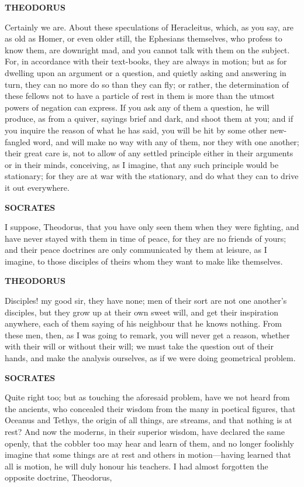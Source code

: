\documentclass[11pt,letter]{article}
\begin{document}
\par \textbf{THEODORUS}
\par   Certainly we are. About these speculations of Heracleitus, which, as you say, are as old as Homer, or even older still, the Ephesians themselves, who profess to know them, are downright mad, and you cannot talk with them on the subject. For, in accordance with their text-books, they are always in motion; but as for dwelling upon an argument or a question, and quietly asking and answering in turn, they can no more do so than they can fly; or rather, the determination of these fellows not to have a particle of rest in them is more than the utmost powers of negation can express. If you ask any of them a question, he will produce, as from a quiver, sayings brief and dark, and shoot them at you; and if you inquire the reason of what he has said, you will be hit by some other new-fangled word, and will make no way with any of them, nor they with one another; their great care is, not to allow of any settled principle either in their arguments or in their minds, conceiving, as I imagine, that any such principle would be stationary; for they are at war with the stationary, and do what they can to drive it out everywhere.

\par \textbf{SOCRATES}
\par   I suppose, Theodorus, that you have only seen them when they were fighting, and have never stayed with them in time of peace, for they are no friends of yours; and their peace doctrines are only communicated by them at leisure, as I imagine, to those disciples of theirs whom they want to make like themselves.

\par \textbf{THEODORUS}
\par   Disciples! my good sir, they have none; men of their sort are not one another's disciples, but they grow up at their own sweet will, and get their inspiration anywhere, each of them saying of his neighbour that he knows nothing. From these men, then, as I was going to remark, you will never get a reason, whether with their will or without their will; we must take the question out of their hands, and make the analysis ourselves, as if we were doing geometrical problem.

\par \textbf{SOCRATES}
\par   Quite right too; but as touching the aforesaid problem, have we not heard from the ancients, who concealed their wisdom from the many in poetical figures, that Oceanus and Tethys, the origin of all things, are streams, and that nothing is at rest? And now the moderns, in their superior wisdom, have declared the same openly, that the cobbler too may hear and learn of them, and no longer foolishly imagine that some things are at rest and others in motion—having learned that all is motion, he will duly honour his teachers. I had almost forgotten the opposite doctrine, Theodorus,
 
\end{document}
